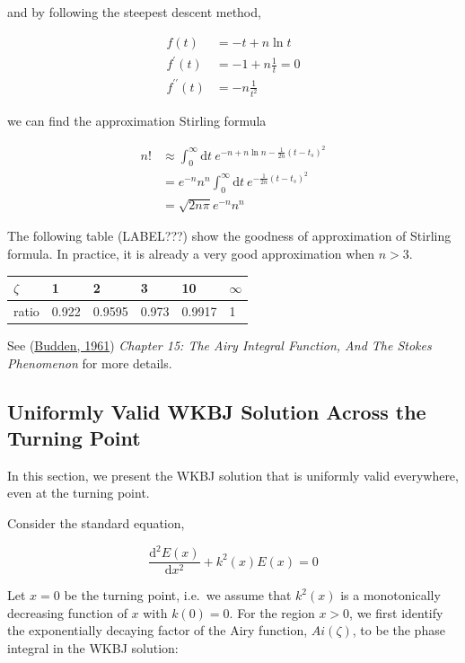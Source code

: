 \documentclass[
  notoc %
]{tufte-book}
\begin{document}
and by following the steepest descent method,

\[
\begin{aligned}
f(t) &= -t +n\ln{t} \\
f^\prime(t) &= -1 + n\frac{1}{t}=0 \\
f^{\prime\prime}(t) &= -n\frac{1}{t^2}
\end{aligned}
\]

we can find the approximation Stirling formula

\[
\begin{aligned}
n! &\approx \int_0^\infty \mathrm{d}t\ e^{-n+n\ln{n}-\frac{1}{2n}(t-t_s)^2} \\
&=e^{-n}n^n \int_0^\infty \mathrm{d}t\ e^{-\frac{1}{2n}(t-t_s)^2} \\
&=\sqrt{2n\pi}e^{-n}n^n
\end{aligned}
\]

The following table (LABEL???) show the goodness of approximation of
Stirling formula. In practice, it is already a very good approximation
when \(n>3\).

\begin{longtable}[]{@{}llllll@{}}
\toprule
\(\zeta\) & 1 & 2 & 3 & 10 & \(\infty\) \\
\midrule
\endhead
ratio & 0.922 & 0.9595 & 0.973 & 0.9917 & 1 \\
\bottomrule
\end{longtable}

See (\protect\hyperlink{ref-budden1961radio}{Budden, 1961})
\emph{Chapter 15: The Airy Integral Function, And The Stokes Phenomenon}
for more details.

\hypertarget{uniformly-valid-wkbj-solution-across-the-turning-point}{%
\subsection{Uniformly Valid WKBJ Solution Across the Turning
Point}\label{uniformly-valid-wkbj-solution-across-the-turning-point}}

In this section, we present the WKBJ solution that is uniformly valid
everywhere, even at the turning point.

Consider the standard equation,

\[
\frac{\mathrm{d}^2E(x)}{\mathrm{d}x^2}+k^2(x)E(x) = 0
\]

Let \(x=0\) be the turning point, i.e.~we assume that \(k^2(x)\) is a
monotonically decreasing function of \(x\) with \(k(0)=0\). For the
region \(x>0\), we first identify the exponentially decaying factor of
the Airy function, \(Ai(\zeta)\), to be the phase integral in the WKBJ
solution:
\end{document}
